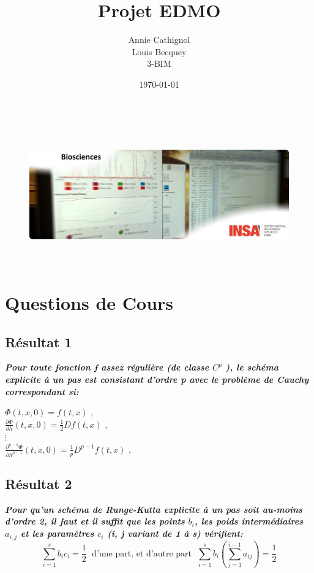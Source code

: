 \documentclass[a4paper,12pt,landscape]{article}
\begin{document}
\title{Projet EDMO}
\author{Annie Cathignol\\Louis Becquey\\3-BIM}
\date{\today}
\maketitle
\begin{figure}[h!]
\centering
\includegraphics[height=6cm]{matlabresult.png}
\end{figure}

\newpage

\section{Questions de Cours}
\subsection{Résultat 1}
{\it \bf Pour toute fonction f assez régulière (de classe $C^{p}$ ), le schéma explicite à un pas est consistant d’ordre p avec le problème de Cauchy correspondant si:}\\
\begin{center}
$\Phi (t,x,0) = f(t,x)$ ,  \\
$\frac{\partial \Phi}{\partial h} (t,x,0) = \frac{1}{2}Df(t,x)$ , \\
$\vdots$ \\
$\frac{\partial^{p-1}\Phi}{\partial h^{p-1}} (t,x,0) = \frac{1}{p}D^{p-1}f(t,x)$ , \\
\end{center}


\subsection{Résultat 2}
{\it \bf Pour qu’un schéma de Runge-Kutta explicite à un pas soit au-moins d’ordre 2, il faut et il suffit que les points $b_{i}$, les poids intermédiaires $a_{i,j}$ et les paramètres $c_{i}$ (i, j variant de 1 à s) vérifient:} $$\sum_{i=1}^{s}b_{i}c_{i} = \frac{1}{2} \; \textrm{   d'une part, et d'autre part   } \; \sum_{i=1}^{s}b_{i}\left(\sum_{j=1}^{i-1}a_{ij}\right)= \frac{1}{2}$$
\end{document}
